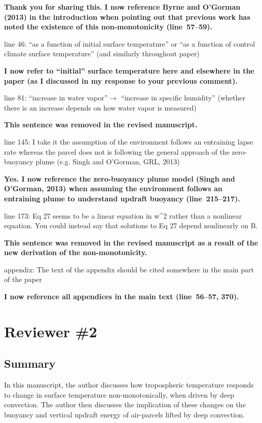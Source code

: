 \documentclass{article}
\begin{document}
\par
\textbf{Thank you for sharing this. I now reference Byrne and O'Gorman (2013) in the introduction when pointing out that previous work has noted the existence of this non-monotonicity (line~57--59).}
\par
line 46: ``as a function of initial surface temperature'' or ``as a function of control climate surface temperature'' (and similarly throughout paper)
\par
\textbf{I now refer to ``initial'' surface temperature here and elsewhere in the paper (as I discussed in my response to your previous comment).}
\par
line 81: ``increase in water vapor''$\rightarrow$ ``increase in specific humidity'' (whether there is an increase depends on how water vapor is measured)
\par
\textbf{This sentence was removed in the revised manuscript.}
\par
line 145: I take it the assumption of the environment follows an entraining lapse rate whereas the parcel does not is following the general approach of the zero-buoyancy plume (e.g. Singh and O'Gorman, GRL, 2013)
\par
\textbf{Yes. I now reference the zero-buoyancy plume model (Singh and O'Gorman, 2013) when assuming the environment follows an entraining plume to understand updraft buoyancy (line~215--217).}
\par
line 173: Eq 27 seems to be a linear equation in w\^{}2 rather than a nonlinear equation. You could instead say that solutions to Eq 27 depend nonlinearly on B.
\par
\textbf{This sentence was removed in the revised manuscript as a result of the new derivation of the non-monotonicity.}
\par
appendix: The text of the appendix should be cited somewhere in the main part of the paper
\par
\textbf{I now reference all appendices in the main text (line~56--57, 370).}
\newpage
\section*{Reviewer \#2}
\subsection*{Summary}
In this manuscript, the author discusses how tropospheric temperature responds to change in surface temperature non-monotonically, when driven by deep convection. The author then discusses the implication of these changes on the buoyancy and vertical updraft energy of air-parcels lifted by deep convection.
\end{document}

